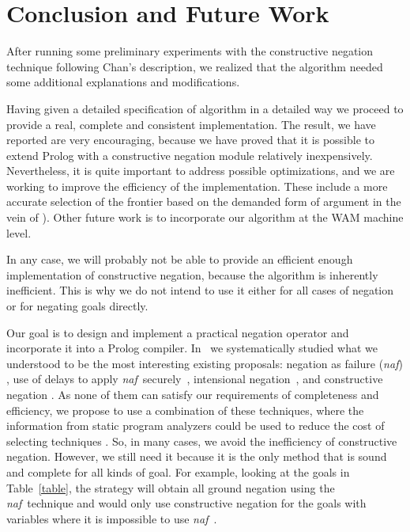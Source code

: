 \documentclass{llncs}
\newcommand{\naf}{{\em naf}}\newcommand{\viejo}[1]{}
\begin{document}
 


\vspace{-1em}
\section{Conclusion and Future Work}
\label{conclusion}
\vspace{-1em}
After running some preliminary experiments with the constructive 
negation technique  following Chan's description, we realized that the
algorithm needed some additional explanations and modifications.

Having given a detailed specification of algorithm in a detailed way
we proceed to provide a real, complete and consistent
implementation. The result, we have reported are very encouraging,
because we have proved that it is possible to extend Prolog with a
constructive negation module relatively inexpensively. Nevertheless,
it is quite important to address possible optimizations, and we are
working to improve the efficiency of the implementation. These include
a more accurate selection of the frontier based on the demanded form
of argument in the vein of \cite{Moreno2}). Other future work is to
incorporate our algorithm at the WAM machine level.

In any case, we will probably not be able to provide an efficient enough
implementation of constructive negation, because the algorithm is
inherently inefficient.  This is why we do not intend to
use it either for all cases of negation or for negating goals
directly.

Our goal is to design and implement a practical negation operator and
incorporate it into a Prolog compiler.
In~\cite{SusanaPADL2000,SusanaLPAR01} we systematically studied what
we understood to be the most interesting existing proposals: negation
as failure (\naf) \cite{Clark}, use of delays to apply \naf\
securely~\cite{naish:lncs}, intensional
negation~\cite{Barbuti1,Barbuti2}, and constructive negation
\cite{Chan1,Chan2,Drabent,Stuckey,Stuckey95}. As none of them can
satisfy our requirements of completeness and efficiency, we propose to
use a combination of these techniques, where the information from
static program analyzers could be used to reduce the cost of selecting
techniques \cite{SusanaLPAR01}. So, in many cases, we avoid the
inefficiency of constructive negation. However, we still need it
because it is the only method that is sound and complete for all kinds
of goal. For example, looking at the goals in Table~\ref{table}, the
strategy will obtain all ground negation using the \naf\ technique and
would only use constructive negation for the goals with variables
where it is impossible to use \naf\ .
\end{document}
